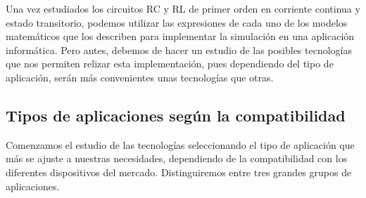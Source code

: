 \documentclass[../main.tex]{subfiles}
\begin{document}
Una vez estudiados los circuitos RC y RL de primer orden en corriente continua y estado transitorio, podemos utilizar las expresiones de cada uno de los modelos matemáticos que los describen para implementar la simulación en una aplicación informática. Pero antes, debemos de hacer un estudio de las posibles tecnologías que nos permiten relizar esta implementación, pues dependiendo del tipo de aplicación, serán más convenientes unas tecnologías que otras.

\subsection{Tipos de aplicaciones según la compatibilidad}
Comenzamos el estudio de las tecnologías seleccionando el tipo de aplicación que más se ajuste a nuestras necesidades, dependiendo de la compatibilidad con los diferentes dispositivos del mercado. Distinguiremos entre tres grandes grupos de aplicaciones.
\end{document}

